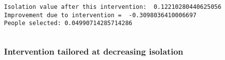 \documentclass[11pt]{article}
\makeatletter
\newcommand{\boxspacing}{\kern\kvtcb@left@rule\kern\kvtcb@boxsep}
\newcommand{\prompt}[4]{
        {\ttfamily\llap{{\color{#2}[#3]:\hspace{3pt}#4}}\vspace{-\baselineskip}}
    }
\makeatother
\begin{document}
    \begin{Verbatim}[commandchars=\\\{\}]
Isolation value after this intervention:  0.12210280440625056
Improvement due to intervention =  -0.3098036410006697
People selected: 0.04990714285714286
    \end{Verbatim}

    \begin{tcolorbox}[breakable, size=fbox, boxrule=1pt, pad at break*=1mm,colback=cellbackground, colframe=cellborder]
\prompt{In}{incolor}{ }{\boxspacing}
\begin{Verbatim}[commandchars=\\\{\}]

\end{Verbatim}
\end{tcolorbox}

    \hypertarget{intervention-tailored-at-decreasing-isolation}{%
\subsubsection{Intervention tailored at decreasing
isolation}\label{intervention-tailored-at-decreasing-isolation}}
\end{document}
